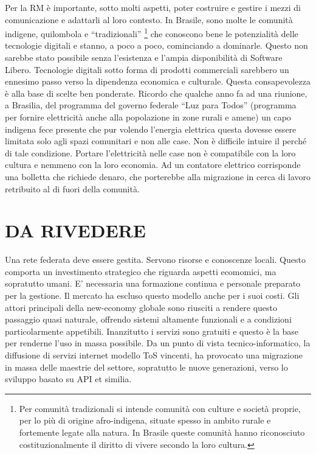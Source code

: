 Per la RM è importante, sotto molti aspetti, poter costruire e gestire
i mezzi di comunicazione e adattarli al loro contesto. In Brasile,
sono molte le comunità indigene, quilombola e ``tradizionali''
\footnote{Per comunità tradizionali si intende comunità con culture e
  società proprie, per lo più di origine afro-indigena, situate spesso
  in ambito rurale e fortemente legate alla natura. In Brasile queste
  comunità hanno riconosciuto costituzionalmente il diritto di vivere
  secondo la loro cultura.} che conoscono bene le potenzialità delle
tecnologie digitali e stanno, a poco a poco, cominciando a
dominarle. Questo non sarebbe stato possibile senza l'esistenza e
l'ampia disponibilità di Software Libero. Tecnologie digitali sotto
forma di prodotti commerciali sarebbero un ennesimo passo verso la
dipendenza economica e culturale. Questa consapevolezza è alla base di
scelte ben ponderate. Ricordo che qualche anno fa ad una riunione, a
Brasilia, del programma del governo federale ``Luz para Todos''
(programma per fornire elettricità anche alla popolazione in zone
rurali e amene) un capo indigena fece presente che pur volendo
l'energia elettrica questa dovesse essere limitata solo agli spazi
comunitari e non alle case. Non è difficile intuire il perché di tale
condizione. Portare l'elettricità nelle case non è compatibile con la
loro cultura e nemmeno con la loro economia. Ad un contatore elettrico
corrisponde una bolletta che richiede denaro, che porterebbe alla
migrazione in cerca di lavoro retribuito al di fuori della comunità.

\section{DA RIVEDERE}
Una rete federata deve essere gestita. Servono risorse e conoscenze
locali. Questo comporta un investimento strategico che riguarda
aspetti ecomomici, ma sopratutto umani. E' necessaria una formazione
continua e personale preparato per la gestione. Il mercato ha escluso
questo modello anche per i suoi costi. Gli attori principali della
new-economy globale sono riusciti a rendere questo passaggio quasi
naturale, offrendo sistemi altamente funzionali e a condizioni
particolarmente appetibili. Inanzitutto i servizi sono gratuiti e
questo è la base per renderne l'uso in massa possibile. Da un punto di
vista tecnico-informatico, la diffusione di servizi internet modello
ToS vincenti, ha provocato una migrazione in massa delle maestrie del
settore, sopratutto le nuove generazioni, verso lo sviluppo basato su
API et similia.

